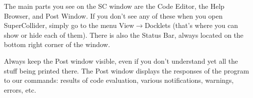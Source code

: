 The main parts you see on the SC window are the Code Editor, the Help Browser, and Post Window. If you don't see any of these when you open SuperCollider, simply go to the menu View$\rightarrow$Docklets (that's where you can show or hide each of them). There is also the Status Bar, always located on the bottom right corner of the window.

Always keep the Post window visible, even if you don't understand yet all the stuff being printed there. The Post window displays the responses of the program to our commands: results of code evaluation, various notifications, warnings, errors, etc.

\bigskip
{}
\bigskip


